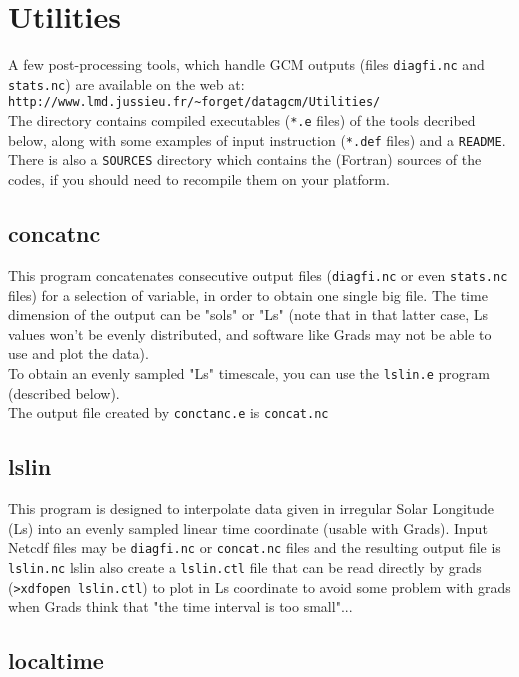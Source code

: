 \chapter{Utilities}

\label{sc:utilities}

A few post-processing tools, which handle GCM outputs (files
{\tt diagfi.nc} and {\tt stats.nc}) are available on the web at:\\
\verb+http://www.lmd.jussieu.fr/~forget/datagcm/Utilities/+\\
The directory contains compiled executables (\verb+*.e+ files) of the tools
decribed below, along with some examples of input instruction
(\verb+*.def+ files) and a \verb+README+.\\
There is also a \verb+SOURCES+ directory which contains the (Fortran)
sources of the codes, if you should need to recompile them
on your platform.

\section{concatnc}
This program concatenates consecutive
output files ({\tt diagfi.nc} or even {\tt stats.nc} files) for a selection of 
variable, in order to obtain one single big file.
The time dimension of the output can
be "sols" or "Ls" (note that in that latter case, Ls values won't be
evenly distributed, and
software like Grads may not be able to use and plot the data).\\
To obtain an evenly sampled "Ls"
timescale, you can use the {\tt lslin.e} program (described below).\\
The output file created by {\tt conctanc.e} is {\tt concat.nc}

\section{lslin}

This program is designed to interpolate data given
in  irregular Solar Longitude (Ls) into an evenly sampled
linear time coordinate (usable with Grads).
Input Netcdf files may be {\tt diagfi.nc} or {\tt concat.nc}  
files and the resulting
output file is {\tt lslin.nc}
lslin also create a {\tt lslin.ctl} file that can be read
directly by grads (\verb+>xdfopen lslin.ctl+) to plot in Ls coordinate to
avoid some problem with grads when Grads think that "the time interval
is too small"...

\section{localtime}

